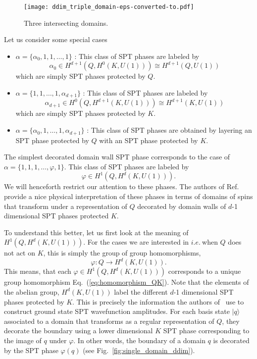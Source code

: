 \documentclass[aps,amsfonts,pra,twocolumn,showpacs]{revtex4-1}
\def\ket#1{\vert#1\rangle}
\newcommand{\thatis}{$i.e.~$}
\begin{document}
	\begin{figure}[!htb]
		\texttt{[image: ddim\_triple\_domain-eps-converted-to.pdf]}
		\caption{Three intersecting domains. \label{fig:three_domains_ddim}}
	\end{figure}	
	
Let us consider some special cases
\begin{itemize}
	\item $\alpha = \{\alpha_0,1,1, \ldots,1 \}$  : This class of SPT phases are labeled by 
	\begin{equation}
	\alpha_0 \in H^{d+1}(Q , H^0(K,U(1))) \cong H^{d+1}(Q,U(1))
	\end{equation}
	which are simply SPT phases protected by $Q$.
	\item $\alpha = \{1,1,\ldots,1,\alpha_{d+1} \}$  : This class of SPT phases are labeled by 
	\begin{equation}
	\alpha_{d+1} \in H^0(Q , H^{d+1}(K,U(1))) \cong H^{d+1}(K,U(1))
	\end{equation}
	which are simply SPT phases protected by $K$.
	\item $\alpha = \{\alpha_0,1,\ldots,1,\alpha_{d+1} \}$  : This class of SPT phases are obtained by layering an SPT phase protected by $Q$ with an SPT phase protected by $K$.
\end{itemize}
The simplest decorated domain wall SPT phase corresponds to the case of $\alpha = \{1,1,1, \ldots,\varphi,1 \}$. This class of SPT phases are labeled by 
\begin{equation}
\varphi \in H^{1}(Q , H^d(K,U(1))).
\end{equation}
We will henceforth restrict our attention to these phases. The authors of Ref.~\cite{Chen2014} provide a nice physical interpretation of these phases in terms of domains of spins that transform under a representation of $Q$ decorated by domain walls of $d$-1 dimensional SPT phases protected $K$. 

To understand this better, let us first look at the meaning of $H^{1}(Q , H^d(K,U(1)))$. For the cases we are interested in \thatis when $Q$ does not act on $K$, this is simply the group of group homomorphisms,
\begin{equation}\label{eq:homomorphism_QK}
\varphi: Q \rightarrow H^d(K,U(1)).
\end{equation}
This means, that each $\varphi \in H^{1}(Q , H^d(K,U(1)))$ corresponds to a unique group homomorphism Eq.~(\ref{eq:homomorphism_QK}). Note that the elements of the abelian group, $H^d(K,U(1))$ label the different $d$-1 dimensional SPT phases protected by $K$. This is precisely the information the authors of~\cite{Chen2014} use to construct ground state SPT wavefunction amplitudes. For each basis state $\ket{q}$ associated to a domain that transforms as a regular representation of $Q$, they decorate the boundary using a lower dimensional $K$ SPT phase corresponding to the image of $q$ under $\varphi$. In other words, the boundary of a domain $q$ is decorated by the SPT phase $\varphi(q)$ (see Fig.~\ref{fig:single_domain_ddim}). 
\end{document}
